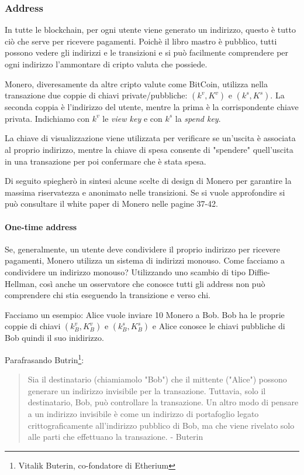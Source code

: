 \documentclass[12pt,a4paper]{article}
\begin{document}
\subsubsection{Address}
In tutte le blockchain, per ogni utente viene generato un indirizzo, questo è
tutto ciò che serve per ricevere pagamenti. Poichè il libro mastro è pubblico,
tutti possono vedere gli indirizzi e le transizioni e si può facilmente
comprendere per ogni indirizzo l'ammontare di cripto valuta che possiede.

Monero, diveresamente da altre cripto valute come BitCoin, utilizza nella
transazione due coppie di chiavi private/pubbliche: $(k^v, K^v)$ e $(k^s, K^s)$.
La seconda coppia è l'indirizzo del utente, mentre la prima è la corrispondente
chiave privata. Indichiamo con $k^v$ le \textit{view key} e con $k^s$ la
\textit{spend key}.

La chiave di visualizzazione viene utilizzata per verificare se un'uscita è
associata al proprio indirizzo, mentre la chiave di spesa consente di "spendere"
quell'uscita in una transazione per poi confermare che è stata spesa.

Di seguito spiegherò in sintesi alcune scelte di design di Monero per garantire
la massima riservatezza e anonimato nelle transizioni. Se si vuole approfondire
si può consultare il white paper di Monero \cite{Zero To Monero} nelle pagine
37-42.

\paragraph{One-time address}
Se, generalmente, un utente deve condividere il proprio indirizzo per ricevere
pagamenti, Monero utilizza un sistema di indirizzi monouso. Come facciamo a
condividere un indirizzo monouso? Utilizzando uno scambio di tipo
Diffie-Hellman, così anche un osservatore che conosce tutti gli address non può
comprendere chi stia eseguendo la transizione e verso chi.

Facciamo un esempio: Alice vuole inviare 10 Monero a Bob. Bob ha le proprie
coppie di chiavi $(k^v_B, K^v_B)$ e $(k^s_B, K^s_B)$ e Alice conosce le chiavi
pubbliche di Bob quindi il suo inidirizzo.

Parafrasando Butrin\footnote{Vitalik Buterin, co-fondatore di Etherium}:
\begin{quote}
    Sia il destinatario (chiamiamolo "Bob") che il mittente ("Alice") possono
    generare un indirizzo invisibile per la transazione. Tuttavia, solo il
    destinatario, Bob, può controllare la transazione. Un altro modo di pensare
    a un indirizzo invisibile è come un indirizzo di portafoglio legato
    crittograficamente all’indirizzo pubblico di Bob, ma che viene rivelato solo
    alle parti che effettuano la transazione. - Buterin \cite{Buterin Quote}
\end{quote}
\end{document}
